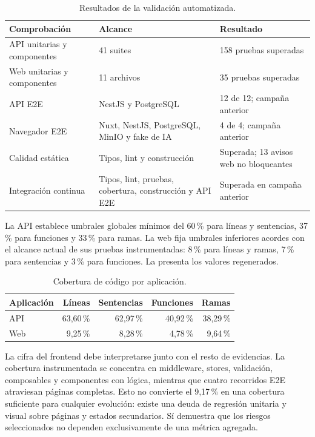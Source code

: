 \begin{table}[H]
  \centering
  \small
  \caption{Resultados de la validación automatizada.}
  \label{tab:automated-test-results}
  \begin{tabular}{@{}p{4.2cm}p{5.8cm}p{3.8cm}@{}}
    \toprule
    \textbf{Comprobación} & \textbf{Alcance} & \textbf{Resultado} \\
    \midrule
    API unitarias y componentes & 41 suites & 158 pruebas superadas \\
    Web unitarias y componentes & 11 archivos & 35 pruebas superadas \\
    API E2E & NestJS y PostgreSQL & 12 de 12; campaña anterior \\
    Navegador E2E & Nuxt, NestJS, PostgreSQL, MinIO y fake de IA & 4 de 4; campaña anterior \\
    Calidad estática & Tipos, lint y construcción & Superada; 13 avisos web no bloqueantes \\
    Integración continua & Tipos, lint, pruebas, cobertura, construcción y API E2E & Superada en campaña anterior \\
    \bottomrule
  \end{tabular}
\end{table}

La API establece umbrales globales mínimos del 60\,\% para líneas y
sentencias, 37\,\% para funciones y 33\,\% para ramas. La web fija umbrales
inferiores acordes con el alcance actual de sus pruebas instrumentadas: 8\,\%
para líneas y ramas, 7\,\% para sentencias y 3\,\% para funciones. La
 presenta los valores regenerados.

\begin{table}[H]
  \centering
  \small
  \caption{Cobertura de código por aplicación.}
  \label{tab:coverage-results}
  \begin{tabular}{@{}lrrrr@{}}
    \toprule
    \textbf{Aplicación} & \textbf{Líneas} & \textbf{Sentencias} & \textbf{Funciones} & \textbf{Ramas} \\
    \midrule
    API & 63,60\,\% & 62,97\,\% & 40,92\,\% & 38,29\,\% \\
    Web & 9,25\,\% & 8,28\,\% & 4,78\,\% & 9,64\,\% \\
    \bottomrule
  \end{tabular}
\end{table}

La cifra del frontend debe interpretarse junto con el resto de evidencias. La
cobertura instrumentada se concentra en middleware, stores, validación,
composables y componentes con lógica, mientras que cuatro recorridos E2E
atraviesan páginas completas. Esto no convierte el 9,17\,\% en una cobertura
suficiente para cualquier evolución: existe una deuda de regresión unitaria y
visual sobre páginas y estados secundarios. Sí demuestra que los riesgos
seleccionados no dependen exclusivamente de una métrica agregada.

